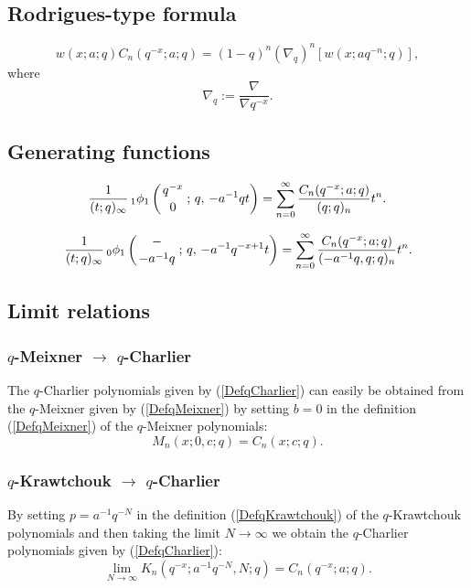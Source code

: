 \documentclass[envcountchap,graybox]{svmono}
\newcounter{rom}
\newcommand{\qhyp}[5]{\mbox{}_{#1}{\phi}_{#2}
\left(\genfrac{}{}{0pt}{}{#3}{#4}\,;\,q,\,#5\right)}
\begin{document}
\subsection*{Rodrigues-type formula}
\begin{equation}
\label{RodqCharlier}
w(x;a;q)C_n(q^{-x};a;q)=(1-q)^n\left(\nabla_q\right)^n\left[w(x;aq^{-n};q)\right],
\end{equation}
where
$$\nabla_q:=\frac{\nabla}{\nabla q^{-x}}.$$

\subsection*{Generating functions}
\begin{equation}
\label{GenqCharlier1}
\frac{1}{(t;q)_{\infty}}\,\qhyp{1}{1}{q^{-x}}{0}{-a^{-1}qt}
=\sum_{n=0}^{\infty}\frac{C_n(q^{-x};a;q)}{(q;q)_n}t^n.
\end{equation}

\begin{equation}
\label{GenqCharlier2}
\frac{1}{(t;q)_{\infty}}\,\qhyp{0}{1}{-}{-a^{-1}q}{-a^{-1}q^{-x+1}t}
=\sum_{n=0}^{\infty}\frac{C_n(q^{-x};a;q)}{(-a^{-1}q,q;q)_n}t^n.
\end{equation}

\subsection*{Limit relations}

\subsubsection*{$q$-Meixner $\rightarrow$ $q$-Charlier}
The $q$-Charlier polynomials given by (\ref{DefqCharlier}) can easily be
obtained from the $q$-Meixner given by (\ref{DefqMeixner}) by setting $b=0$
in the definition (\ref{DefqMeixner}) of the $q$-Meixner polynomials:
\begin{equation}
M_n(x;0,c;q)=C_n(x;c;q).
\end{equation}

\subsubsection*{$q$-Krawtchouk $\rightarrow$ $q$-Charlier}
By setting $p=a^{-1}q^{-N}$ in the definition (\ref{DefqKrawtchouk}) of the
$q$-Krawtchouk polynomials and then taking the limit $N\rightarrow\infty$ we
obtain the $q$-Charlier polynomials given by (\ref{DefqCharlier}):
$$\lim_{N\rightarrow\infty}K_n(q^{-x};a^{-1}q^{-N},N;q)=C_n(q^{-x};a;q).$$
\end{document}
